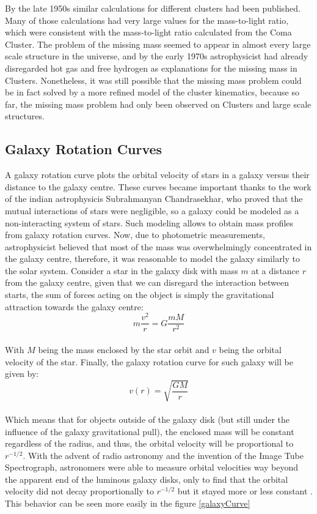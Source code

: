 By the late 1950s similar calculations for different clusters had been published. Many of those calculations had very large values for the mass-to-light ratio\cite{schwarzschildSon}, which were consistent with the mass-to-light ratio calculated from the Coma Cluster. The problem of the missing mass seemed to appear in almost every large scale structure in the universe, and by the early 1970s astrophysicist had already disregarded hot gas\cite{meekins} and free hydrogen\cite{penzias} as explanations for the missing mass in Clusters. Nonetheless, it was still possible that the missing mass problem could be in fact solved by a more refined model of the cluster kinematics, because so far, the missing mass problem had only been observed on Clusters and large scale structures.

\subsection{Galaxy Rotation Curves}
A galaxy rotation curve plots the orbital velocity of stars in a galaxy versus their distance to the galaxy centre. These curves became important thanks to the work of the indian astrophysicis Subrahmanyan Chandrasekhar, who proved that the mutual interactions of stars were negligible, so a galaxy could be modeled as a non-interacting system of stars. Such modeling allows to obtain mass profiles from galaxy rotation curves. Now, due to photometric measurements, astrophysicist believed that most of the mass was overwhelmingly concentrated  in the galaxy centre, therefore, it was reasonable to model the galaxy similarly to the solar system. Consider a star in the galaxy disk with mass $m$ at a distance $r$ from the galaxy centre, given that we can disregard the interaction between starts, the sum of forces acting on the object is simply the gravitational attraction towards the galaxy centre:\\
\begin{equation}
m\frac{v^2}{r} = G \frac{mM}{r^2}
\end{equation}\\
With $M$ being the mass enclosed by the star orbit and $v$ being the orbital velocity of the star. Finally, the galaxy rotation curve for such galaxy will be given by:\\
\begin{equation}
v(r) = \sqrt{\frac{GM}{r}}
\end{equation}\\
Which means that for objects outside of the galaxy disk (but still under the influence of the galaxy gravitational pull), the enclosed mass will be constant regardless of the radius, and thus, the orbital velocity will be proportional to $r^{-1/2}$. With the advent of radio astronomy and the invention of the Image Tube Spectrograph, astronomers were able to measure orbital velocities way beyond the apparent end of the luminous galaxy disks, only to find that the orbital velocity did not decay proportionally to $r^{-1/2}$ but it stayed more or less constant\cite{h21Line} \cite{galactoDistance} \cite{veraFirst}. This behavior can be seen more easily in the figure \ref{galaxyCurve}

